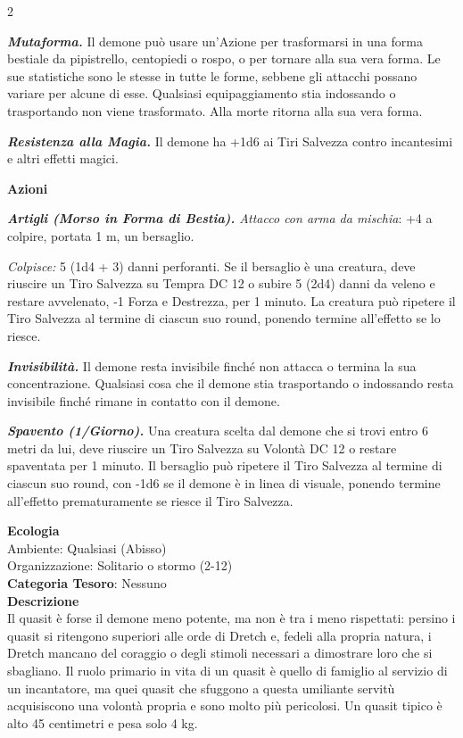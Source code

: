 \begin{multicols}{2}
{\emph{\textbf{Mutaforma.}} Il demone può usare un'Azione per trasformarsi in una forma bestiale da pipistrello, centopiedi o rospo, o per tornare alla sua vera forma. Le sue statistiche sono le stesse in tutte le forme, sebbene gli attacchi possano variare per alcune di esse. Qualsiasi equipaggiamento stia indossando o trasportando non viene trasformato. Alla morte ritorna alla sua vera forma.

\emph{\textbf{Resistenza alla Magia.}} Il demone ha +1d6 ai Tiri Salvezza contro incantesimi e altri effetti magici.

\textbf{Azioni}

\emph{\textbf{Artigli (Morso in Forma di Bestia).} Attacco con arma da mischia}: +4 a colpire, portata 1 m, un bersaglio.

\emph{Colpisce:} 5 (1d4 + 3) danni perforanti. Se il bersaglio è una creatura, deve riuscire un Tiro Salvezza su Tempra DC 12 o subire 5 (2d4) danni da veleno e restare avvelenato, -1 Forza e Destrezza, per 1 minuto. La creatura può ripetere il Tiro Salvezza al termine di ciascun suo round, ponendo termine all'effetto se lo riesce.

\emph{\textbf{Invisibilità.}} Il demone resta invisibile finché non attacca o termina la sua concentrazione. Qualsiasi cosa che il demone stia trasportando o indossando resta invisibile finché rimane in contatto con il demone.

\emph{\textbf{Spavento (1/Giorno).}} Una creatura scelta dal demone che si trovi entro 6 metri da lui, deve riuscire un Tiro Salvezza su Volontà DC 12 o restare spaventata per 1 minuto. Il bersaglio può ripetere il Tiro Salvezza al termine di ciascun suo round, con -1d6 se il demone è in linea di visuale, ponendo termine all'effetto prematuramente se riesce il Tiro Salvezza.

\textbf{Ecologia}\\
Ambiente: Qualsiasi (Abisso)\\
Organizzazione: Solitario o stormo (2-12)\\
\textbf{Categoria Tesoro}: Nessuno\\
\textbf{Descrizione}\\
Il quasit è forse il demone meno potente, ma non è tra i meno rispettati: persino i quasit si ritengono superiori alle orde di Dretch e, fedeli alla propria natura, i Dretch mancano del coraggio o degli stimoli necessari a dimostrare loro che si sbagliano. Il ruolo primario in vita di un quasit è quello di famiglio al servizio di un incantatore, ma quei quasit che sfuggono a questa umiliante servitù acquisiscono una volontà propria e sono molto più pericolosi. Un quasit tipico è alto 45 centimetri e pesa solo 4 kg.

}
\end{multicols}
